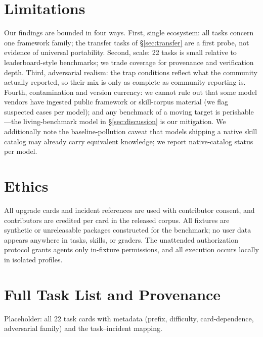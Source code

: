 \documentclass[11pt]{article}
\begin{document}
\section*{Limitations}

Our findings are bounded in four ways.
First, single ecosystem: all tasks concern one framework family; the transfer tasks of \S\ref{sec:transfer} are a first probe, not evidence of universal portability.
Second, scale: 22 tasks is small relative to leaderboard-style benchmarks; we trade coverage for provenance and verification depth.
Third, adversarial realism: the trap conditions reflect what the community actually reported, so their mix is only as complete as community reporting is.
Fourth, contamination and version currency: we cannot rule out that some model vendors have ingested public framework or skill-corpus material (we flag suspected cases per model); and any benchmark of a moving target is perishable---the living-benchmark model in \S\ref{sec:discussion} is our mitigation.
We additionally note the baseline-pollution caveat that models shipping a native skill catalog may already carry equivalent knowledge; we report native-catalog status per model.

\section*{Ethics}

All upgrade cards and incident references are used with contributor consent, and contributors are credited per card in the released corpus.
All fixtures are synthetic or unreleasable packages constructed for the benchmark; no user data appears anywhere in tasks, skills, or graders.
The unattended authorization protocol grants agents only in-fixture permissions, and all execution occurs locally in isolated profiles.




\appendix

\section{Full Task List and Provenance}
\label{app:tasklist}
Placeholder: all 22 task cards with metadata (prefix, difficulty, card-dependence, adversarial family) and the task--incident mapping.
\end{document}
